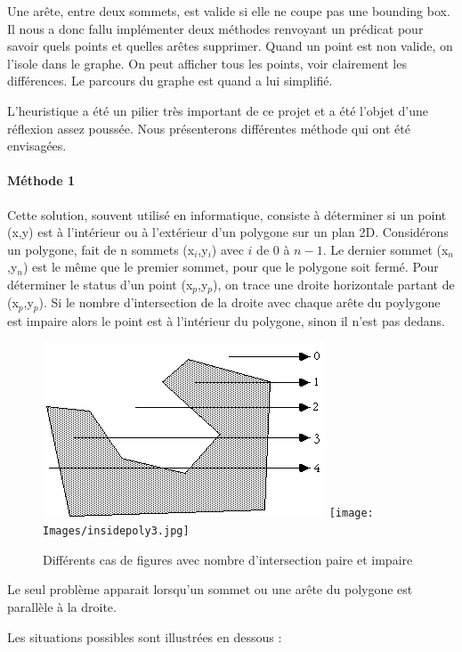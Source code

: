 \documentclass[a4paper,12pt]{report}
\begin{document}
Une arête, entre deux sommets, est valide si elle ne coupe pas une bounding box. Il nous a donc fallu implémenter deux méthodes renvoyant un prédicat pour savoir quels points et quelles arêtes supprimer. 
Quand un point est non valide, on l'isole dans le graphe. On peut afficher tous les points, voir clairement les différences. Le parcours du graphe est quand a lui simplifié.

L'heuristique a été un pilier très important de ce projet et a été l'objet d'une réflexion assez poussée. Nous présenterons différentes méthode qui ont été envisagées.

\paragraph{Méthode 1 }
Cette solution, souvent utilisé en informatique, consiste à déterminer si un point (x,y) est à l'intérieur ou à l'extérieur d'un
polygone sur un plan 2D. 
Considérons un polygone, fait de n sommets (x$_{i}$,y$_{i}$) avec $i$ de $0$ à $n-1$. Le dernier sommet (x$_{n}$,y$_{n}$) est le même que le premier sommet, pour que le polygone soit fermé. 
Pour déterminer le status d'un point (x$_{p}$,y$_{p}$), on trace une droite horizontale partant de (x$_{p}$,y$_{p}$). 
Si le nombre d'intersection de la droite avec chaque arête du poylygone est impaire alors le point est à l'intérieur du polygone, sinon il n'est pas dedans.

\begin{figure}[h]
\centering
\includegraphics[scale=0.6]{Images/insidepoly1.jpg}
\texttt{[image: Images/insidepoly3.jpg]}
\caption{Différents cas de figures avec nombre d'intersection paire et impaire}
\label{nbintersect}
\end{figure}
\vspace{0.5cm}

Le seul problème apparait lorsqu'un sommet ou une arête du polygone est parallèle à la droite.

Les situations possibles sont illustrées en dessous :
\end{document}
